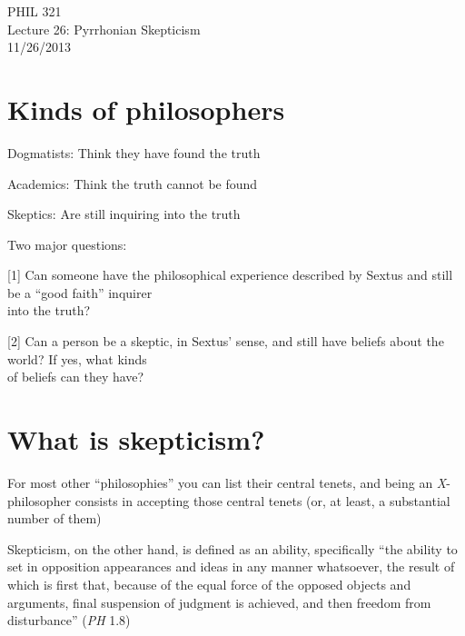 \documentclass[11pt]{article}
\begin{document}
\thispagestyle{empty}
\begin{center} \LARGE{PHIL 321\\ Lecture 26: Pyrrhonian Skepticism}\\ \vspace*{2mm}
\large{11/26/2013}\end{center}
\thispagestyle{empty}\vspace*{3mm}
\vspace*{-8mm}

\section*{Kinds of philosophers}

\noindent Dogmatists: Think they have found the truth
\vspace*{2mm}

\noindent Academics: Think the truth cannot be found
\vspace*{2mm}

\noindent Skeptics: Are still inquiring into the truth
\vspace*{2mm}

\noindent Two major questions:
\vspace*{2mm}

[1] Can someone have the philosophical experience described by Sextus and still be a ``good faith'' inquirer\\\hspace*{12mm}into the truth?
\vspace*{1mm}

[2] Can a person be a skeptic, in Sextus' sense, and still have beliefs about the world? If yes, what kinds\\\hspace*{12mm}of beliefs can they have?

\section*{What is skepticism?}

\noindent For most other ``philosophies'' you can list their central tenets, and being an \emph{X}-philosopher consists in accepting those central tenets (or, at least, a substantial number of them)
\vspace*{2mm}

\noindent Skepticism, on the other hand, is defined as an ability, specifically ``the ability to set in opposition appearances and ideas in any manner whatsoever, the result of which is first that, because of the equal force of the opposed objects and arguments, final suspension of judgment is achieved, and then freedom from disturbance'' (\emph{PH} 1.8)
\vspace*{2mm}
\end{document}

